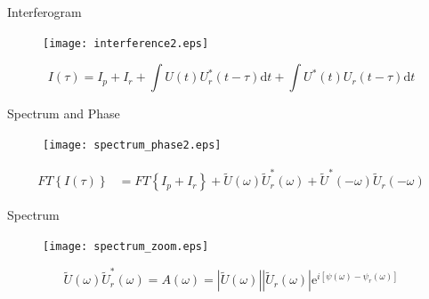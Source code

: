 \documentclass[11pt]{beamer}
\begin{document}
\begin{frame}{Interferogram}
\vspace{-15pt}
\begin{figure}
	\centering
	\texttt{[image: interference2.eps]}
\end{figure}
\vspace{-15pt}
\begin{equation}
	I(\tau) 	= I_p + I_r + \int U(t)U_r^*(t-\tau)\mathrm{d}t + \int U^*(t)U_r(t-\tau)\mathrm{d}t 
	\label{eq_inter}
\end{equation}
\end{frame}

\begin{frame}{Spectrum and Phase}
\vspace{-10pt}
\begin{figure}
	\centering
	\texttt{[image: spectrum\_phase2.eps]}
\end{figure}
\vspace{-20pt}
\begin{align}
FT\left\lbrace I(\tau)\right\rbrace 	&= 	FT\left\lbrace I_p + I_r \right\rbrace 
+ \tilde{U}(\omega)\tilde{U}_r^*(\omega) + \tilde{U}^*(-\omega)\tilde{U}_r(-\omega)
	\label{eq_fourier}
\end{align}
\end{frame}

\begin{frame}{Spectrum}
\vspace{-15pt}
\begin{figure}
	\centering
	\texttt{[image: spectrum\_zoom.eps]}
\end{figure}
\vspace{-5pt}
\begin{equation}
\tilde{U}(\omega)\tilde{U}_r^*(\omega) = A(\omega) = |\tilde{U}(\omega)||\tilde{U}_r(\omega)|\mathrm{e}^{i[\psi(\omega)-\psi_r(\omega)]}
	\label{eq_gauss}
\end{equation}
\end{frame}
\end{document}
